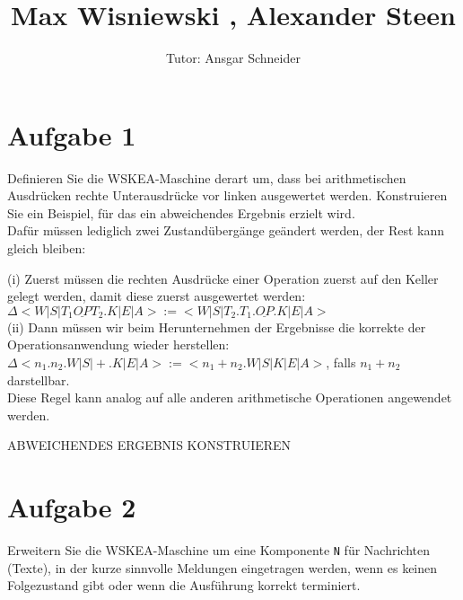 \documentclass[11pt,a4paper,ngerman]{article}
\author{Tutor: Ansgar Schneider}
\date{}
\title{Max Wisniewski , Alexander Steen}
\begin{document}

\maketitle
\thispagestyle{fancy}



\section*{Aufgabe 1}
Definieren Sie die WSKEA-Maschine derart um, dass bei arithmetischen Ausdrücken rechte Unterausdrücke vor linken ausgewertet werden. Konstruieren Sie ein Beispiel, für das ein abweichendes Ergebnis erzielt wird. \\

Dafür müssen lediglich zwei Zustandübergänge geändert werden, der Rest kann gleich bleiben:

(i) Zuerst müssen die rechten Ausdrücke einer Operation zuerst auf den Keller gelegt werden, damit diese zuerst ausgewertet werden: \\

$ \Delta<W | S | T_1 \underline{OP} T_2.K | E | A> :=
        <W | S | T_2.T_1.\underline{OP}.K | E | A>$ \\

(ii) Dann müssen wir beim Herunternehmen der Ergebnisse die korrekte der Operationsanwendung wieder herstellen:\\

$ \Delta<n_1.n_2.W | S | +.K | E | A> :=
        <n_1+n_2.W | S | K | E | A>$, falls $n_1+n_2$ darstellbar.\\

Diese Regel kann analog auf alle anderen arithmetische Operationen angewendet werden.

ABWEICHENDES ERGEBNIS KONSTRUIEREN


\section*{Aufgabe 2}
Erweitern Sie die WSKEA-Maschine um eine Komponente \texttt{N} für Nachrichten (Texte), in der kurze sinnvolle Meldungen eingetragen werden, wenn es keinen Folgezustand gibt oder wenn die Ausführung korrekt terminiert.
\end{document}
